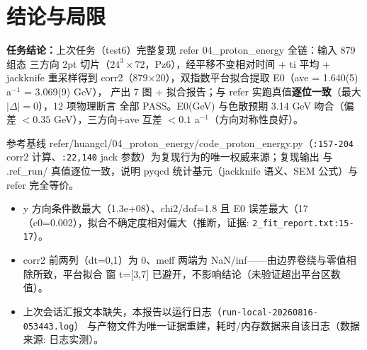 \documentclass[UTF8]{ctexart}
\begin{document}
\section{结论与局限}
\begin{conclbox}
\textbf{任务结论：}上次任务（test6）完整复现 refer 04\_proton\_energy 全链：输入 879 组态
三方向 2pt 切片（$24^3\times72$，Pz6），经平移不变相对时间 + ti 平均 + jackknife 重采样得到
corr2（879$\times$20），双指数平台拟合提取 E0（ave = 1.640(5) a$^{-1}$ = 3.069(9) GeV），
产出 7 图 + 拟合报告；与 refer 实跑真值\textbf{逐位一致}（最大 $|\Delta|=0$），12 项物理断言
全部 PASS。E0(GeV) 与色散预期 3.14 GeV 吻合（偏差 $<0.35$ GeV），三方向+ave 互差
$<0.1$ a$^{-1}$（方向对称性良好）。
\end{conclbox}
\begin{refbox}
参考基线 refer/huangcl/04\_proton\_energy/code\_proton\_energy.py（\texttt{\nolinkurl{:157-204}}
corr2 计算、\texttt{\nolinkurl{:22,140}} jack 参数）为复现行为的唯一权威来源；复现输出
与 .ref\_run/ 真值逐位一致，说明 pyqcd 统计基元（jackknife 语义、SEM 公式）与 refer 完全等价。
\end{refbox}
\begin{warnbox}
\begin{itemize}
\item y 方向条件数最大（1.3e+08）、chi2/dof=1.8 且 E0 误差最大（17%
  （c0=0.002），拟合不确定度相对偏大（\textcolor{warn}{推断}，证据: \texttt{\nolinkurl{2_fit_report.txt:15-17}}）。
\item corr2 前两列（dt=0,1）为 0、meff 两端为 NaN/inf——由边界卷绕与零值相除所致，平台拟合
  窗 t=[3,7] 已避开，不影响结论（\textcolor{warn}{未验证}超出平台区数值）。
\item 上次会话汇报文本缺失，本报告以运行日志（\texttt{\nolinkurl{run-local-20260816-053443.log}}）
  与产物文件为唯一证据重建，耗时/内存数据来自该日志（数据来源: 日志实测）。
\end{itemize}
\end{warnbox}
\end{document}
